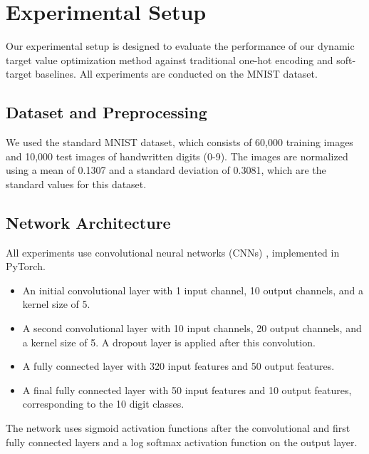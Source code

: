 \documentclass[12pt,fleqn,a4paper]{article}
\begin{document}

\section{Experimental Setup}
 Our experimental setup is designed to evaluate the performance of our dynamic target value optimization method against traditional one-hot encoding and soft-target baselines. All experiments are conducted on the MNIST dataset.

 \subsection{Dataset and Preprocessing}
 We used the standard MNIST dataset, which consists of 60,000 training images and 10,000 test images of handwritten digits (0-9). The images are normalized using a mean of 0.1307 and a standard deviation of 0.3081, which are the standard values for this dataset.

 \subsection{Network Architecture}\label{sec:net_arch}
All experiments use convolutional neural  networks (CNNs) , implemented in PyTorch.

 \begin{itemize}
     \item An initial convolutional layer with 1 input channel, 10 output channels, and a kernel size of 5.
     \item A second convolutional layer with 10 input channels, 20 output channels, and a kernel size of 5. A dropout layer is applied after this convolution.
     \item A fully connected layer with 320 input features and 50 output features.
     \item A final fully connected layer with 50 input features and 10 output features, corresponding to the 10 digit classes.
 \end{itemize}
 The network uses sigmoid activation functions after the convolutional and first fully connected layers and a log softmax activation function on the output layer.
\end{document}
